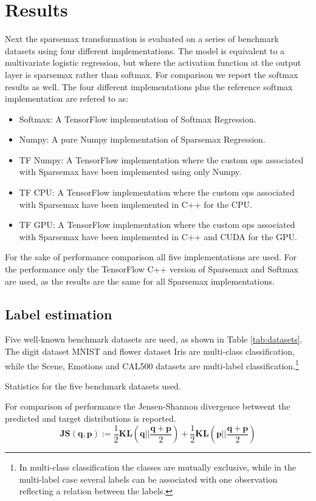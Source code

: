 \section{Results}
Next the sparsemax transformation is evaluated on a series of benchmark datasets using four different implementations. The model is equivalent to a multivariate logistic regression, but where the activation function at the output layer is sparsemax rather than softmax.  For comparison we report the softmax results as well. The four different implementations plus the reference softmax implementation are refered to as:
\begin{itemize}
\item Softmax: A TensorFlow implementation of Softmax Regression.
\item Numpy: A pure Numpy implementation of Sparsemax Regression.
\item TF Numpy: A TensorFlow implementation where the custom ops associated with Sparsemax have been implemented using only Numpy.
\item TF CPU: A TensorFlow implementation where the custom ops associated with Sparsemax have been implemented in C++ for the CPU.
\item TF GPU: A TensorFlow implementation where the custom ops associated with Sparsemax have been implemented in C++ and CUDA for the GPU.
\end{itemize}
For the sake of performance comparison all five implementations are used. For the performance only the TensorFlow C++ version of Sparsemax and Softmax are used, as the results are the same for all Sparsemax implementations.

\subsection{Label estimation}
Five well-known benchmark datasets are used, as shown in Table \ref{tab:datasets}. The digit dataset MNIST and flower dataset Iris are multi-class classification, while the Scene, Emotions and CAL500 datasets are multi-label classification.\footnote{In multi-class classification the classes are mutually exclusive, while in the multi-label case several labels can be associated with one observation reflecting a relation between the labels.} 
\begin{table}[H]
\centering

\caption{Statistics for the five benchmark datasets used.}
\label{tab:datasets}
\end{table}
For comparison of performance the Jensen-Shannon divergence betweent the predicted and target distributions is reported.
\begin{equation*}
\mathbf{JS(q,p)}:=\frac{1}{2}\mathbf{KL}\left(\mathbf{q}\Big|\Big|\frac{\mathbf{q}+\mathbf{p}}{2}\right)+\frac{1}{2}\mathbf{KL}\left(\mathbf{p}\Big|\Big|\frac{\mathbf{q}+\mathbf{p}}{2}\right)
\end{equation*}

